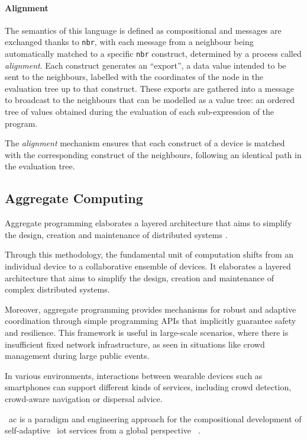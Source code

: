 \paragraph{Alignment}
The semantics of this language is defined as compositional and messages are exchanged thanks to \texttt{nbr}, with each 
message from a neighbour being automatically matched to a specific \texttt{nbr} construct, determined by a process called \emph{alignment}.
Each construct generates an ``export'', a data value intended to be sent to the neighbours, labelled with the coordinates
of the node in the evaluation tree up to that construct.
These exports are gathered into a message to broadcast to the neighbours that can be modelled as a value tree:
an ordered tree of values obtained during the evaluation of each sub-expression of the program.

The \emph{alignment} mechanism ensures that each construct of a device is matched with the corresponding construct of
the neighbours, following an identical path in the evaluation tree.

\subsection{Aggregate Computing}
\label{subsec:aggregate-computing}

Aggregate programming elaborates a layered architecture that aims to simplify the design, creation and maintenance of
distributed systems \cite{CASADEI2019252}.

Through this methodology, the fundamental unit of computation shifts from an individual device to a collaborative
ensemble of devices.
It elaborates a layered architecture that aims to simplify the design, creation and maintenance of complex distributed
systems.

Moreover, aggregate programming provides mechanisms for robust and adaptive coordination through simple programming APIs
that implicitly guarantee safety and resilience.
This framework is useful in large-scale scenarios, where there is insufficient fixed network infrastructure, as seen in
situations like crowd management during large public events.

In various environments, interactions between wearable devices such as smartphones can support different kinds of services,
including crowd detection, crowd-aware navigation or dispersal advice.

~\ac{ac} is a paradigm and engineering approach for the compositional development of self-adaptive ~\ac{iot} services
from a global perspective ~\cite{10.1145/3579353}.

